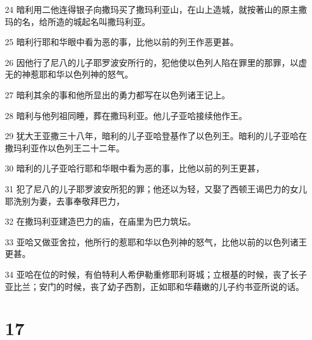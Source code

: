 \par 24 暗利用二他连得银子向撒玛买了撒玛利亚山，在山上造城，就按著山的原主撒玛的名，给所造的城起名叫撒玛利亚。
\par 25 暗利行耶和华眼中看为恶的事，比他以前的列王作恶更甚。
\par 26 因他行了尼八的儿子耶罗波安所行的，犯他使以色列人陷在罪里的那罪，以虚无的神惹耶和华以色列神的怒气。
\par 27 暗利其余的事和他所显出的勇力都写在以色列诸王记上。
\par 28 暗利与他列祖同睡，葬在撒玛利亚。他儿子亚哈接续他作王。
\par 29 犹大王亚撒三十八年，暗利的儿子亚哈登基作了以色列王。暗利的儿子亚哈在撒玛利亚作以色列王二十二年。
\par 30 暗利的儿子亚哈行耶和华眼中看为恶的事，比他以前的列王更甚，
\par 31 犯了尼八的儿子耶罗波安所犯的罪；他还以为轻，又娶了西顿王谒巴力的女儿耶洗别为妻，去事奉敬拜巴力，
\par 32 在撒玛利亚建造巴力的庙，在庙里为巴力筑坛。
\par 33 亚哈又做亚舍拉，他所行的惹耶和华以色列神的怒气，比他以前的以色列诸王更甚。
\par 34 亚哈在位的时候，有伯特利人希伊勒重修耶利哥城；立根基的时候，丧了长子亚比兰；安门的时候，丧了幼子西割，正如耶和华藉嫩的儿子约书亚所说的话。

\chapter{17}

